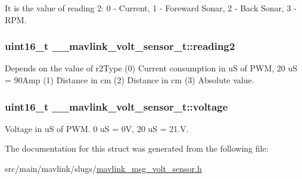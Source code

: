 It is the value of reading 2\+: 0 -\/ Current, 1 -\/ Foreward Sonar, 2 -\/ Back Sonar, 3 -\/ R\+P\+M. 

\hypertarget{struct____mavlink__volt__sensor__t_a2548b639aea459ba70058bbe9d9041ea}{
\subsubsection[{reading2}]{\setlength{\rightskip}{0pt plus 5cm}uint16\+\_\+t \+\_\+\+\_\+mavlink\+\_\+volt\+\_\+sensor\+\_\+t\+::reading2}}\label{struct____mavlink__volt__sensor__t_a2548b639aea459ba70058bbe9d9041ea}


Depends on the value of r2\+Type (0) Current consumption in u\+S of P\+W\+M, 20 u\+S = 90\+Amp (1) Distance in cm (2) Distance in cm (3) Absolute value. 

\hypertarget{struct____mavlink__volt__sensor__t_a268b47347a1ba8bbee75c136ceeff7a5}{
\subsubsection[{voltage}]{\setlength{\rightskip}{0pt plus 5cm}uint16\+\_\+t \+\_\+\+\_\+mavlink\+\_\+volt\+\_\+sensor\+\_\+t\+::voltage}}\label{struct____mavlink__volt__sensor__t_a268b47347a1ba8bbee75c136ceeff7a5}


Voltage in u\+S of P\+W\+M. 0 u\+S = 0\+V, 20 u\+S = 21.\+V. 



The documentation for this struct was generated from the following file\+:\begin{DoxyCompactItemize}
\item 
src/main/mavlink/slugs/\hyperlink{mavlink__msg__volt__sensor_8h}{mavlink\+\_\+msg\+\_\+volt\+\_\+sensor.\+h}\end{DoxyCompactItemize}

